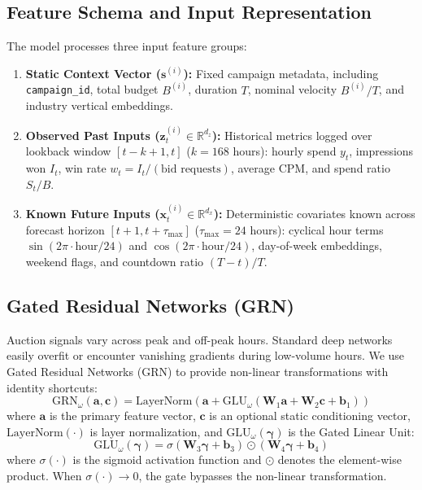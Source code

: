 \documentclass[sigconf]{acmart}
\begin{document}
\subsection{Feature Schema and Input Representation}
The model processes three input feature groups:
\begin{enumerate}
  \item \textbf{Static Context Vector ($\mathbf{s}^{(i)}$):} Fixed campaign metadata, including \texttt{campaign\_id}, total budget $B^{(i)}$, duration $T$, nominal velocity $B^{(i)}/T$, and industry vertical embeddings.
  \item \textbf{Observed Past Inputs ($\mathbf{z}_t^{(i)} \in \mathbb{R}^{d_z}$):} Historical metrics logged over lookback window $[t-k+1, t]$ ($k=168$ hours): hourly spend $y_t$, impressions won $I_t$, win rate $w_t = I_t / (\text{bid requests})$, average CPM, and spend ratio $S_t / B$.
  \item \textbf{Known Future Inputs ($\mathbf{x}_t^{(i)} \in \mathbb{R}^{d_x}$):} Deterministic covariates known across forecast horizon $[t+1, t+\tau_{\max}]$ ($\tau_{\max}=24$ hours): cyclical hour terms $\sin(2\pi \cdot \text{hour}/24)$ and $\cos(2\pi \cdot \text{hour}/24)$, day-of-week embeddings, weekend flags, and countdown ratio $(T - t)/T$.
\end{enumerate}

\subsection{Gated Residual Networks (GRN)}
Auction signals vary across peak and off-peak hours. Standard deep networks easily overfit or encounter vanishing gradients during low-volume hours. We use Gated Residual Networks (GRN) to provide non-linear transformations with identity shortcuts:
\begin{equation}
  \mathrm{GRN}_\omega(\mathbf{a}, \mathbf{c}) = \mathrm{LayerNorm}\left(\mathbf{a} + \mathrm{GLU}_\omega\left(\mathbf{W}_{1}\mathbf{a} + \mathbf{W}_{2}\mathbf{c} + \mathbf{b}_{1}\right)\right)
\end{equation}
where $\mathbf{a}$ is the primary feature vector, $\mathbf{c}$ is an optional static conditioning vector, $\mathrm{LayerNorm}(\cdot)$ is layer normalization, and $\mathrm{GLU}_\omega(\boldsymbol{\gamma})$ is the Gated Linear Unit:
\begin{equation}
  \mathrm{GLU}_\omega(\boldsymbol{\gamma}) = \sigma\left(\mathbf{W}_3 \boldsymbol{\gamma} + \mathbf{b}_3\right) \odot \left(\mathbf{W}_4 \boldsymbol{\gamma} + \mathbf{b}_4\right)
\end{equation}
where $\sigma(\cdot)$ is the sigmoid activation function and $\odot$ denotes the element-wise product. When $\sigma(\cdot) \to 0$, the gate bypasses the non-linear transformation.
\end{document}
